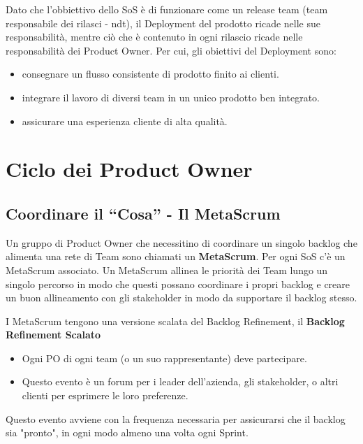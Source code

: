 \documentclass[12pt,a4paper,parskip=full]{scrartcl}
\begin{document}
Dato che l'obbiettivo dello SoS è di funzionare come un release team (team responsabile dei rilasci - ndt), il Deployment del prodotto ricade nelle sue responsabilità, mentre ciò che è contenuto in ogni rilascio ricade nelle responsabilità dei Product Owner. Per cui, gli obiettivi del Deployment sono:
\begin{itemize}
\item consegnare un flusso consistente di prodotto finito ai clienti.
\item integrare il lavoro di diversi team in un unico prodotto ben integrato.
\item assicurare una esperienza cliente di alta qualità.
\end{itemize}

\section{Ciclo dei Product Owner}
\subsection{Coordinare il ``Cosa'' - Il MetaScrum}
Un gruppo di Product Owner che necessitino di coordinare un singolo backlog che alimenta una rete di Team sono chiamati un \textbf{MetaScrum}. Per ogni SoS c'è un MetaScrum associato. Un MetaScrum allinea le priorità dei Team lungo un singolo percorso in modo che questi possano coordinare i propri backlog e creare un buon allineamento con gli stakeholder in modo da supportare il backlog stesso.

I MetaScrum tengono una versione scalata del Backlog Refinement, il \textbf{Backlog Refinement Scalato} 
\begin{itemize}
\item Ogni PO di ogni team (o un suo rappresentante) deve partecipare.
\item Questo evento è un forum per i leader dell'azienda, gli stakeholder, o altri clienti per esprimere le loro preferenze.
\end{itemize}
Questo evento avviene con la frequenza necessaria per assicurarsi che il backlog sia "pronto", in ogni modo almeno una volta ogni Sprint.
\end{document}
